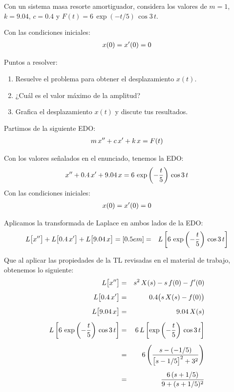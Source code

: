 Con un sistema masa resorte amortiguador, considera los valores de $m = 1$, $k = 9.04$, $c= 0.4$ y $F(t) =  6 \, \exp(-t/5) \, \cos 3 \, t$.

Con las condiciones iniciales:
\begin{align*}
x(0) = {x}^{\prime}(0) = 0
\end{align*}

Puntos a resolver:
\begin{enumerate}
\item Resuelve el problema para obtener el desplazamiento $x(t)$.
\item ¿Cuál es el valor máximo de la amplitud?
\item Grafica el desplazamiento $x(t)$ y discute tus resultados.
\end{enumerate}

Partimos de la siguiente EDO:
\begin{align*}
m \, {x}^{\prime \prime} + c \, {x}^{\prime} + k \, x = F(t)
\end{align*}

Con los valores señalados en el enunciado, tenemos la EDO:
\begin{align*}
{x}^{\prime \prime} + 0.4 \, {x}^{\prime} + 9.04 \, x = 6 \, \exp\left( -\dfrac{t}{5}\right) \, \cos 3 \, t
\end{align*}
Con las condiciones iniciales:
\begin{align*}
x(0) = {x}^{\prime}(0) = 0
\end{align*}

Aplicamos la transformada de Laplace en ambos lados de la EDO:
\begin{align*}
L \big[{x}^{\prime \prime}\big] &+ L\big[0.4 \, {x}^{\prime}\big] + L \big[9.04 \, x\big] = [0.5em]
=& L \left[ 6 \, \exp \left( -\dfrac{t}{5}\right) \, \cos 3 \, t \right]
\end{align*}

Que al aplicar las propiedades de la TL revisadas en el material de trabajo, obtenemos lo siguiente:
\begin{eqnarray*}
L \big[{x}^{\prime \prime}\big] &=& s^{2} \, X(s) - s \, f(0) - {f}^{\prime}(0) \\[0.5em] 
L \big[0.4 \, {x}^{\prime}\big] &=& 0. 4 \big( s \, X(s) - f(0)\big) \\[0.5em] 
L \big[9.04 \, x\big] &=& 9.04 \, X(s) \\[0.5em]
L \left[ 6 \, \exp \left( -\dfrac{t}{5}\right) \, \cos 3 \, t \right] &=& 6 \, L \left[\exp \left( -\dfrac{t}{5}\right) \, \cos 3 \, t \right] \\[0.5em] 
&=& 6 \left( \dfrac{s - (-1/5)}{\big[s - 1/5\big]^{2} + 3^{2}} \right) \\[0.5em] 
&=& \dfrac{6 \, (s + 1/5)}{9 + (s + 1/5)^{2}}
\end{eqnarray*}

